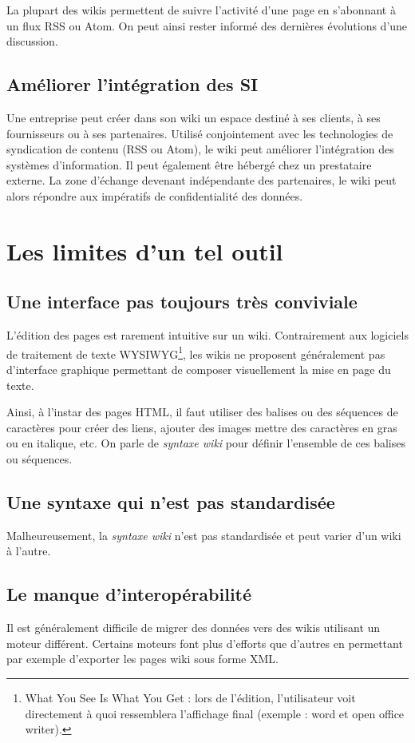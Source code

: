 \documentclass{article}
\begin{document}
La plupart des wikis permettent de suivre l'activité d'une page en s'abonnant à un flux RSS ou Atom. On peut ainsi rester informé des dernières évolutions d'une discussion.

\subsection{Améliorer l'intégration des SI}
Une entreprise peut créer dans son wiki un espace destiné à ses clients, à ses fournisseurs ou à ses partenaires. Utilisé conjointement avec les technologies de syndication de contenu (RSS ou Atom), le wiki peut améliorer l'intégration des systèmes d'information. Il peut également être hébergé chez un prestataire externe. La zone d'échange devenant indépendante des partenaires, le wiki peut alors répondre aux impératifs de confidentialité des données.


\section{Les limites d'un tel outil}
\subsection{Une interface pas toujours très conviviale}
L'édition des pages est rarement intuitive sur un wiki. Contrairement aux logiciels de traitement de texte WYSIWYG\footnote{What You See Is What You Get : lors de l'édition, l'utilisateur voit directement à quoi ressemblera l'affichage final (exemple : word et open office writer).}, les wikis ne proposent généralement pas d'interface graphique permettant de composer visuellement la mise en page du texte.

Ainsi, à l'instar des pages HTML, il faut utiliser des balises ou des séquences de caractères pour créer des liens, ajouter des images mettre des caractères en gras ou en italique, etc. On parle de \emph{syntaxe wiki} pour définir l'ensemble de ces balises ou séquences.

\subsection{Une syntaxe qui n'est pas standardisée}
Malheureusement, la \emph{syntaxe wiki} n'est pas standardisée et peut varier d'un wiki à l'autre.

\subsection{Le manque d'interopérabilité}
Il est généralement difficile de migrer des données vers des wikis utilisant un moteur différent. Certains moteurs font plus d'efforts que d'autres en permettant  par exemple d'exporter les pages wiki sous forme XML.
\end{document}
